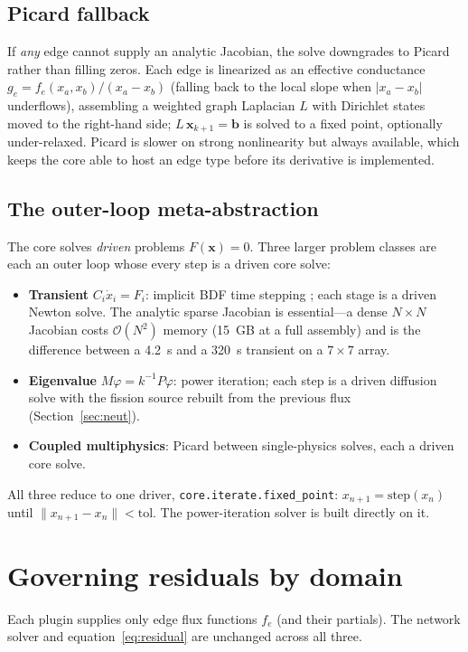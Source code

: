 \documentclass[11pt]{article}
\begin{document}
\subsection{Picard fallback}
If \emph{any} edge cannot supply an analytic Jacobian, the solve downgrades to
Picard rather than filling zeros. Each edge is linearized as an effective
conductance $g_e = f_e(x_a,x_b)/(x_a-x_b)$ (falling back to the local slope when
$|x_a-x_b|$ underflows), assembling a weighted graph Laplacian $L$ with Dirichlet
states moved to the right-hand side; $L\,\mathbf{x}_{k+1}=\mathbf{b}$ is solved to
a fixed point, optionally under-relaxed. Picard is slower on strong
nonlinearity but always available, which keeps the core able to host an edge type
before its derivative is implemented.

\subsection{The outer-loop meta-abstraction}\label{sec:outer}
The core solves \emph{driven} problems $F(\mathbf{x})=0$. Three larger problem
classes are each an outer loop whose every step is a driven core solve:
\begin{itemize}\setlength\itemsep{1pt}
\item \textbf{Transient} $C_i\dot x_i = F_i$: implicit BDF time stepping
\cite{scipy}; each stage is a driven Newton solve. The analytic sparse Jacobian
is essential---a dense $N\times N$ Jacobian costs $\mathcal{O}(N^2)$ memory
(\SI{15}{GB} at a full assembly) and is the difference between a \SI{4.2}{s} and
a \SI{320}{s} transient on a $7\times7$ array.
\item \textbf{Eigenvalue} $M\varphi = k^{-1}P\varphi$: power iteration; each
step is a driven diffusion solve with the fission source rebuilt from the
previous flux (Section~\ref{sec:neut}).
\item \textbf{Coupled multiphysics}: Picard between single-physics solves, each
a driven core solve.
\end{itemize}
All three reduce to one driver, \texttt{core.iterate.fixed\_point}:
$x_{n+1}=\text{step}(x_n)$ until $\lVert x_{n+1}-x_n\rVert<\text{tol}$. The
power-iteration solver is built directly on it.

\section{Governing residuals by domain}\label{sec:dom}
Each plugin supplies only edge flux functions $f_e$ (and their partials). The
network solver and equation~\eqref{eq:residual} are unchanged across all three.
\end{document}
